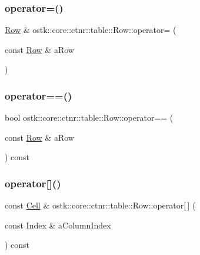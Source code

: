 \mbox{\label{classostk_1_1core_1_1ctnr_1_1table_1_1_row_a3d83b95c0bfcdd1a111a8329250f0caf}} 
\subsubsection{\texorpdfstring{operator=()}{operator=()}}
{\footnotesize\ttfamily \hyperlink{classostk_1_1core_1_1ctnr_1_1table_1_1_row}{Row} \& ostk\+::core\+::ctnr\+::table\+::\+Row\+::operator= (\begin{DoxyParamCaption}\item[{const \hyperlink{classostk_1_1core_1_1ctnr_1_1table_1_1_row}{Row} \&}]{a\+Row }\end{DoxyParamCaption})}

\mbox{\label{classostk_1_1core_1_1ctnr_1_1table_1_1_row_a2be316029aeee1d6c6bf2040d2a06ec7}} 
\subsubsection{\texorpdfstring{operator==()}{operator==()}}
{\footnotesize\ttfamily bool ostk\+::core\+::ctnr\+::table\+::\+Row\+::operator== (\begin{DoxyParamCaption}\item[{const \hyperlink{classostk_1_1core_1_1ctnr_1_1table_1_1_row}{Row} \&}]{a\+Row }\end{DoxyParamCaption}) const}

\mbox{\label{classostk_1_1core_1_1ctnr_1_1table_1_1_row_a74f6773d021b59498c636bf32be0e8ab}} 
\subsubsection{\texorpdfstring{operator[]()}{operator[]()}\hspace{0.1cm}{\footnotesize\ttfamily [1/2]}}
{\footnotesize\ttfamily const \hyperlink{namespaceostk_1_1core_1_1ctnr_1_1table_a697fb8eda17fde15703741a0c49036b9}{Cell} \& ostk\+::core\+::ctnr\+::table\+::\+Row\+::operator\mbox{[}$\,$\mbox{]} (\begin{DoxyParamCaption}\item[{const Index \&}]{a\+Column\+Index }\end{DoxyParamCaption}) const}

